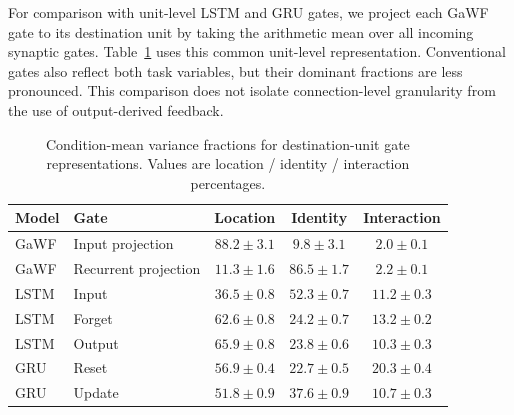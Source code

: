 \begin{table}[t]
\centering
\caption{Condition-mean variance fractions for encoder and hidden activations. Each cell reports location / identity / interaction in percent as mean \(\pm\) seed-level SEM over ten training seeds.}
\label{tab:activation-condition-variance}
\end{table}

For comparison with unit-level LSTM and GRU gates, we project each GaWF gate to its destination unit by taking the arithmetic mean over all incoming synaptic gates. Table~\ref{tab:unit-gate-variance} uses this common unit-level representation. Conventional gates also reflect both task variables, but their dominant fractions are less pronounced. This comparison does not isolate connection-level granularity from the use of output-derived feedback.

\begin{table}[t]
\centering
\caption{Condition-mean variance fractions for destination-unit gate representations. Values are location / identity / interaction percentages.}
\label{tab:unit-gate-variance}
\begin{tabular}{llccc}
\toprule
Model & Gate & Location & Identity & Interaction \\
\midrule
GaWF & Input projection & \(88.2\pm3.1\) & \(9.8\pm3.1\) & \(2.0\pm0.1\) \\
GaWF & Recurrent projection & \(11.3\pm1.6\) & \(86.5\pm1.7\) & \(2.2\pm0.1\) \\
LSTM & Input & \(36.5\pm0.8\) & \(52.3\pm0.7\) & \(11.2\pm0.3\) \\
LSTM & Forget & \(62.6\pm0.8\) & \(24.2\pm0.7\) & \(13.2\pm0.2\) \\
LSTM & Output & \(65.9\pm0.8\) & \(23.8\pm0.6\) & \(10.3\pm0.3\) \\
GRU & Reset & \(56.9\pm0.4\) & \(22.7\pm0.5\) & \(20.3\pm0.4\) \\
GRU & Update & \(51.8\pm0.9\) & \(37.6\pm0.9\) & \(10.7\pm0.3\) \\
\bottomrule
\end{tabular}
\end{table}

